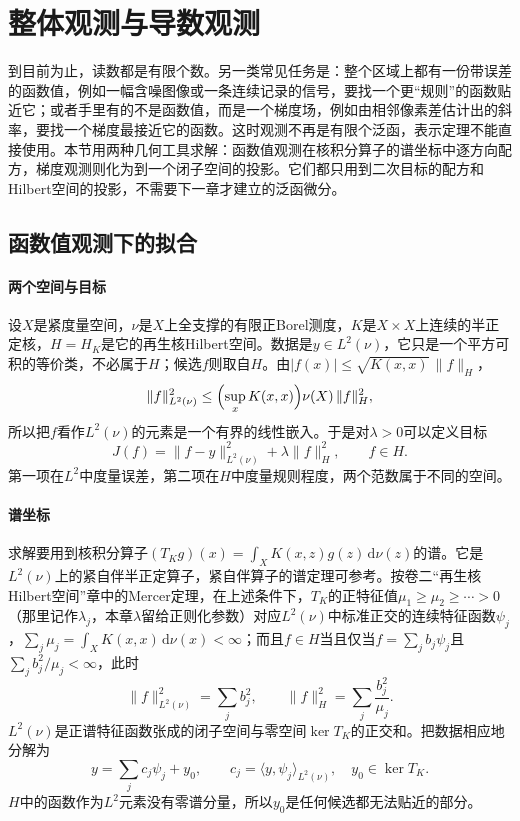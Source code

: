 \section{整体观测与导数观测}
\label{sec:opt-fit-global}

到目前为止，读数都是有限个数。另一类常见任务是：整个区域上都有一份带误差的函数值，例如一幅含噪图像或一条连续记录的信号，要找一个更“规则”的函数贴近它；或者手里有的不是函数值，而是一个梯度场，例如由相邻像素差估计出的斜率，要找一个梯度最接近它的函数。这时观测不再是有限个泛函，表示定理不能直接使用。本节用两种几何工具求解：函数值观测在核积分算子的谱坐标中逐方向配方，梯度观测则化为到一个闭子空间的投影。它们都只用到二次目标的配方和Hilbert空间的投影，不需要下一章才建立的泛函微分。

\subsection{函数值观测下的拟合}
\label{sec:opt-fit-function-values}

\paragraph{两个空间与目标}
设$X$是紧度量空间，$\nu$是$X$上全支撑的有限正Borel测度，$K$是$X\times X$上连续的半正定核，$H=H_K$是它的再生核Hilbert空间。数据是$y\in L^2(\nu)$，它只是一个平方可积的等价类，不必属于$H$；候选$f$则取自$H$。由$|f(x)|\le\sqrt{K(x,x)}\,\|f\|_H$，
\[
  \|f\|_{L^2(\nu)}^2\le\Bigl(\sup_xK(x,x)\Bigr)\nu(X)\,\|f\|_H^2,
\]
所以把$f$看作$L^2(\nu)$的元素是一个有界的线性嵌入。于是对$\lambda>0$可以定义目标
\begin{equation}
  J(f)=\|f-y\|_{L^2(\nu)}^2+\lambda\|f\|_H^2,\qquad f\in H .
  \label{eq:opt-fit-global-objective}
\end{equation}
第一项在$L^2$中度量误差，第二项在$H$中度量规则程度，两个范数属于不同的空间。

\paragraph{谱坐标}
求解要用到核积分算子$(T_Kg)(x)=\int_XK(x,z)g(z)\,\mathrm d\nu(z)$的谱。它是$L^2(\nu)$上的紧自伴半正定算子，紧自伴算子的谱定理可参考。按卷二“再生核Hilbert空间”章中的Mercer定理，在上述条件下，$T_K$的正特征值$\mu_1\ge\mu_2\ge\cdots>0$（那里记作$\lambda_j$，本章$\lambda$留给正则化参数）对应$L^2(\nu)$中标准正交的连续特征函数$\psi_j$，$\sum_j\mu_j=\int_XK(x,x)\,\mathrm d\nu(x)<\infty$；而且$f\in H$当且仅当$f=\sum_jb_j\psi_j$且$\sum_jb_j^2/\mu_j<\infty$，此时
\begin{equation}
  \|f\|_{L^2(\nu)}^2=\sum_jb_j^2,\qquad \|f\|_H^2=\sum_j\frac{b_j^2}{\mu_j}.
  \label{eq:opt-fit-spectral-norms}
\end{equation}
$L^2(\nu)$是正谱特征函数张成的闭子空间与零空间$\ker T_K$的正交和。把数据相应地分解为
\[
  y=\sum_jc_j\psi_j+y_0,\qquad c_j=\langle y,\psi_j\rangle_{L^2(\nu)},\quad y_0\in\ker T_K .
\]
$H$中的函数作为$L^2$元素没有零谱分量，所以$y_0$是任何候选都无法贴近的部分。

